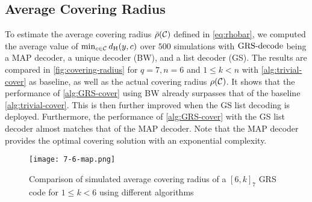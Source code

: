\documentclass[conference]{IEEEtran}
\begin{document}
\subsection{Average Covering Radius}
\label{sec:average-covering-radius}

To estimate the average covering radius $\bar\rho({\mathcal C})$ defined in \eqref{eq:rhobar}, we computed the average value of $\min_{c \in {\mathcal C}} d_{{\rm H}}(y, c)$ over $500$ simulations with $\operatorname{GRS-decode}$ being a MAP decoder, a unique decoder (BW), and a list decoder (GS). The results are compared in \autoref{fig:covering-radius} for $q = 7, n = 6$ and $1 \le k < n$ with \autoref{alg:trivial-cover} as baseline, as well as the actual covering radius $\rho(\CC)\hide{ = d - 1}$. 
It shows that the performance of \autoref{alg:GRS-cover} using BW already surpasses that of the baseline \autoref{alg:trivial-cover}. This is then further improved when the GS list decoding is deployed. Furthermore, the performance of \autoref{alg:GRS-cover} with the GS list decoder almost matches that of the MAP decoder. Note that the MAP decoder provides the optimal covering solution with an exponential complexity.%




\begin{figure}[!htbp]
    \centering
    \texttt{[image: 7-6-map.png]}
    \caption{Comparison of simulated average covering radius of a $[6, k]_{7}$ GRS code for $1 \le k < 6$ using different algorithms}
    \label{fig:covering-radius}
\end{figure}
\end{document}
